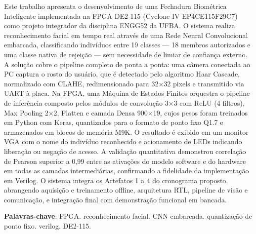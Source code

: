 
\setlength{\absparsep}{18pt} %
\begin{resumo}
Este trabalho apresenta o desenvolvimento de uma Fechadura Biométrica Inteligente implementada na FPGA DE2-115 (Cyclone IV EP4CE115F29C7) como projeto integrador da disciplina ENGG52 da UFBA. O sistema realiza reconhecimento facial em tempo real através de uma Rede Neural Convolucional embarcada, classificando indivíduos entre 19 classes — 18 membros autorizados e uma classe nativa de rejeição — sem necessidade de limiar de confiança externo.
A solução cobre o pipeline completo de ponta a ponta: uma câmera conectada ao PC captura o rosto do usuário, que é detectado pelo algoritmo Haar Cascade, normalizado com CLAHE, redimensionado para 32×32 pixels e transmitido via UART à placa. Na FPGA, uma Máquina de Estados Finitos orquestra o pipeline de inferência composto pelos módulos de convolução 3×3 com ReLU (4 filtros), Max Pooling 2×2, Flatten e camada Densa 900×19, cujos pesos foram treinados em Python com Keras, quantizados para o formato de ponto fixo Q1.7 e armazenados em blocos de memória M9K. O resultado é exibido em um monitor VGA com o nome do indivíduo reconhecido e acionamento de LEDs indicando liberação ou negação de acesso.
A validação quantitativa demonstrou correlação de Pearson superior a 0,99 entre as ativações do modelo software e do hardware em todas as camadas intermediárias, confirmando a fidelidade da implementação em Verilog. O sistema integra os Artefatos 1 a 4 do cronograma proposto, abrangendo aquisição e treinamento offline, arquitetura RTL, pipeline de visão e comunicação, e integração final com demonstração funcional em bancada.


 \textbf{Palavras-chave}: FPGA. reconhecimento facial. CNN embarcada. quantização de ponto fixo. verilog. DE2-115.
\end{resumo}

